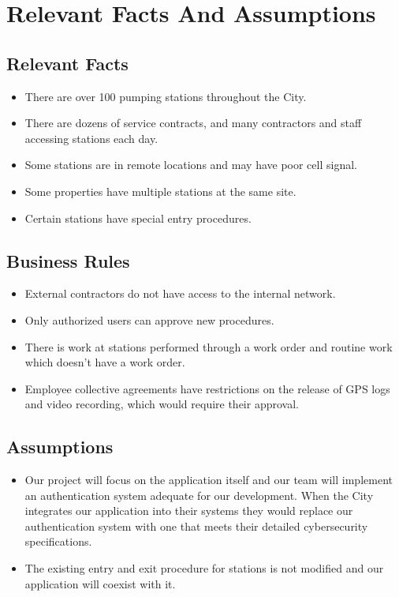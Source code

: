 \documentclass[12pt]{article}
\begin{document}
\section{Relevant Facts And Assumptions}
\subsection{Relevant Facts}
\begin{itemize}
    \item There are over 100 pumping stations throughout the City.
    \item There are dozens of service contracts, and many contractors
    and staff accessing stations each day.
    \item Some stations are in remote locations and may have poor cell signal.
    \item Some properties have multiple stations at the same site.
    \item Certain stations have special entry procedures.
\end{itemize}

\subsection{Business Rules}
\begin{itemize}
    \item External contractors do not have access to the internal network.
    \item Only authorized users can approve new procedures. 
    \item There is work at stations performed through a work order
    and routine work which doesn't have a work order.
    \item Employee collective agreements have restrictions on the release of
    GPS logs and video recording, which would require their approval.
\end{itemize}
\subsection{Assumptions}
\begin{itemize}
    \item Our project will focus on the application itself
    and our team will implement an authentication system adequate for our
    development. When the City integrates our application into their systems 
    they would replace our authentication system with one that meets their 
    detailed cybersecurity specifications.
    \item The existing entry and exit procedure for stations is not modified
    and our application will coexist with it.
\end{itemize}
\end{document}

